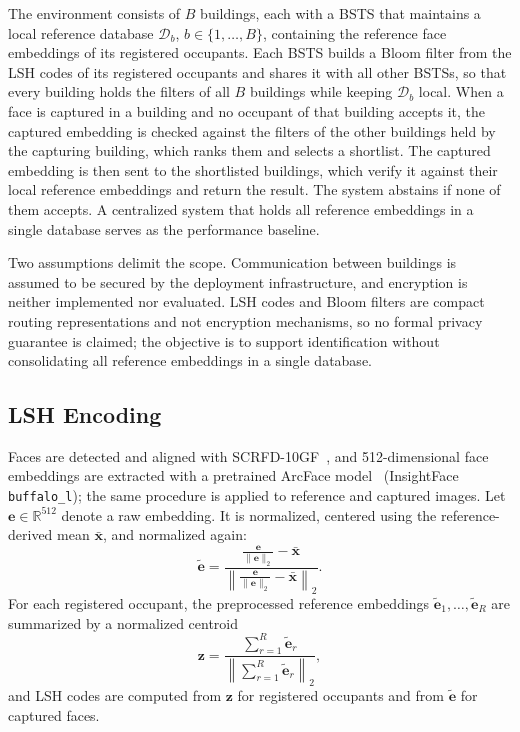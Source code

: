 \documentclass[pdflatex,sn-mathphys-num]{sn-jnl}%
\providecommand{\code}[1]{\texttt{#1}}%
\theoremstyle{thmstyleone}%
\theoremstyle{thmstyletwo}%
\theoremstyle{thmstylethree}%
\begin{document}
The environment consists of $B$ buildings, each with a BSTS that maintains a local reference database $\mathcal{D}_b$, $b\in\{1,\ldots,B\}$, containing the reference face embeddings of its registered occupants. Each BSTS builds a Bloom filter from the LSH codes of its registered occupants and shares it with all other BSTSs, so that every building holds the filters of all $B$ buildings while keeping $\mathcal{D}_b$ local. When a face is captured in a building and no occupant of that building accepts it, the captured embedding is checked against the filters of the other buildings held by the capturing building, which ranks them and selects a shortlist. The captured embedding is then sent to the shortlisted buildings, which verify it against their local reference embeddings and return the result. The system abstains if none of them accepts. A centralized system that holds all reference embeddings in a single database serves as the performance baseline.

Two assumptions delimit the scope. Communication between buildings is assumed to be secured by the deployment infrastructure, and encryption is neither implemented nor evaluated. LSH codes and Bloom filters are compact routing representations and not encryption mechanisms, so no formal privacy guarantee is claimed; the objective is to support identification without consolidating all reference embeddings in a single database.

\subsection{LSH Encoding}
\label{subsec:lsh_encoding}

Faces are detected and aligned with SCRFD-10GF~\cite{guo2022}, and 512-dimensional face embeddings are extracted with a pretrained ArcFace model~\cite{deng2019} (InsightFace \code{buffalo\_l}); the same procedure is applied to reference and captured images. Let $\mathbf{e} \in \mathbb{R}^{512}$ denote a raw embedding. It is normalized, centered using the reference-derived mean $\bar{\mathbf{x}}$, and normalized again:
\begin{equation}
    \tilde{\mathbf{e}}
    =
    \frac{
        \frac{\mathbf{e}}{\|\mathbf{e}\|_2}
        - \bar{\mathbf{x}}
    }{
        \left\|
        \frac{\mathbf{e}}{\|\mathbf{e}\|_2}
        - \bar{\mathbf{x}}
        \right\|_2
    }.
    \label{eq:embedding_preprocessing}
\end{equation}
For each registered occupant, the preprocessed reference embeddings $\tilde{\mathbf{e}}_1,\ldots,\tilde{\mathbf{e}}_R$ are summarized by a normalized centroid
\begin{equation}
    \mathbf{z}
    =
    \frac{
        \sum_{r=1}^{R}\tilde{\mathbf{e}}_r
    }{
        \left\|\sum_{r=1}^{R}\tilde{\mathbf{e}}_r\right\|_2
    },
    \label{eq:identity_centroid}
\end{equation}
and LSH codes are computed from $\mathbf{z}$ for registered occupants and from $\tilde{\mathbf{e}}$ for captured faces.
\end{document}
